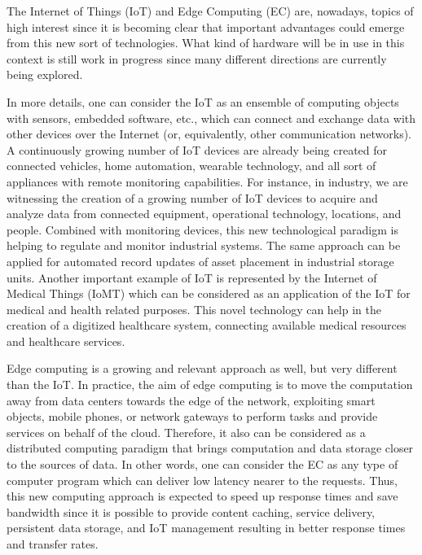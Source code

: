 \documentclass{book}
\begin{document}
The Internet of Things (IoT) and Edge Computing (EC) are, nowadays, topics of high interest since
it is becoming clear that important advantages could emerge from this new sort of    technologies.
What kind of hardware will be in use in this context is still work in progress         since many
different directions are currently being explored.

In more details, one can consider the IoT as an ensemble        of computing objects with sensors,
embedded software, etc., which can connect and exchange data with other devices over the Internet
(or, equivalently, other communication networks). A continuously growing number of    IoT devices
are already being created for connected vehicles, home automation, wearable technology, and   all
sort of appliances with remote monitoring capabilities.         For instance, in industry, we are
witnessing the creation of a growing number of IoT devices       to acquire and analyze data from
connected equipment, operational technology, locations, and people.      Combined with monitoring
devices, this new technological paradigm is helping to regulate and monitor industrial    systems.
The same approach can be applied for automated record updates    of asset placement in industrial
storage units. Another important example of IoT is represented by the  Internet of Medical Things
(IoMT) which can be considered as an application of the IoT for medical and        health related
purposes. This novel technology can help in the creation         of a digitized healthcare system,
connecting available medical resources and healthcare services.

Edge computing is a growing and relevant approach as well, but very different than the IoT.    In
practice, the aim of edge computing is to move the computation away from data centers towards the
edge of the network, exploiting smart objects, mobile phones,      or network gateways to perform
tasks and provide services on behalf of the cloud.      Therefore, it also can be considered as a
distributed computing  paradigm that brings computation and data storage closer to the sources of
data. In other words, one can consider the EC as any type of computer   program which can deliver
low latency nearer to the requests. Thus, this new computing approach is expected     to speed up
response times and save bandwidth since it is possible to provide content caching,        service
delivery, persistent data storage,      and IoT management resulting in better response times and
transfer rates.
\end{document}
